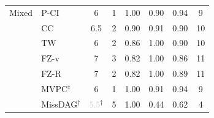 \begin{tabular}{llcccccc}
    \midrule
    Mixed     & P-CI               & 6 & 1 & 1.00 & 0.90 & 0.94 & 9 \\
              & CC                 & 6.5 & 2 & 0.90 & 0.91 & 0.90 & 10 \\
              & TW                 & 6 & 2 & 0.86 & 1.00 & 0.90 & 10 \\
              & FZ-v               & 7 & 3 & 0.82 & 1.00 & 0.86 & 11 \\
              & FZ-R               & 7 & 2 & 0.82 & 1.00 & 0.89 & 11 \\
              & MVPC$^\ddagger$    & 6 & 1 & 1.00 & 0.91 & 0.94 & 9 \\
              & MissDAG$^\dagger$  & \textcolor{lightgray}{5.5}$^\dagger$ & 5 & 1.00 & 0.44 & 0.62 & 4 \\
    \bottomrule
\end{tabular}
